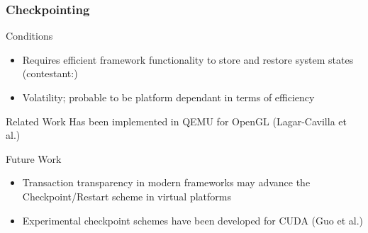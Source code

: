 
\begin{frame}

\frametitle{Checkpointing}

\begin{block}{Conditions}
	\begin{itemize}
		\item Requires efficient framework functionality to store and restore system states (contestant:)
		\item Volatility; probable to be platform dependant in terms of efficiency
	\end{itemize}
\end{block}

\begin{block}{Related Work}
	Has been implemented in QEMU for OpenGL (Lagar-Cavilla et al.)
\end{block}

\begin{block}{Future Work}
	\begin{itemize}
		\item Transaction transparency in modern frameworks may advance the Checkpoint/Restart scheme in virtual platforms
		\item Experimental checkpoint schemes have been developed for CUDA (Guo et al.)
	\end{itemize}
\end{block}

\end{frame}
